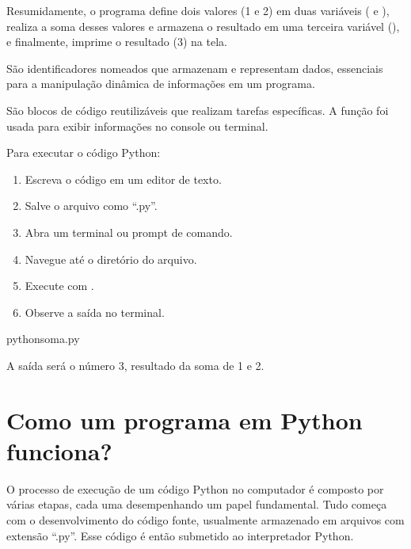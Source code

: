 \documentclass[letterpaper,10pt,english]{jupyterBook}
\begin{document}
\sphinxAtStartPar
Resumidamente, o programa define dois valores (1 e 2) em duas variáveis ( e ), realiza a soma desses valores e armazena o resultado em uma terceira variável (), e finalmente, imprime o resultado (3) na tela.

\sphinxAtStartPar
{}

\sphinxAtStartPar
São identificadores nomeados que armazenam e representam dados, essenciais para a manipulação dinâmica de informações em um programa.

\sphinxAtStartPar
{}

\sphinxAtStartPar
São blocos de código reutilizáveis que realizam tarefas específicas. A função  foi usada para exibir informações no console ou terminal.

\sphinxAtStartPar
Para executar o código Python:
\begin{enumerate}
%
\item {} 
\sphinxAtStartPar
Escreva o código em um editor de texto.

\item {} 
\sphinxAtStartPar
Salve o arquivo como “.py”.

\item {} 
\sphinxAtStartPar
Abra um terminal ou prompt de comando.

\item {} 
\sphinxAtStartPar
Navegue até o diretório do arquivo.

\item {} 
\sphinxAtStartPar
Execute com .

\item {} 
\sphinxAtStartPar
Observe a saída no terminal.

\end{enumerate}

\begin{sphinxVerbatim}[commandchars=\\\{\}]
pythonsoma.py
\end{sphinxVerbatim}

\sphinxAtStartPar
A saída será o número 3, resultado da soma de 1 e 2.


\section{Como um programa em Python funciona?}
\label{\detokenize{chapters/ch1/ch1:como-um-programa-em-python-funciona}}
\sphinxAtStartPar
O processo de execução de um código Python no computador é composto por várias etapas, cada uma desempenhando um papel fundamental. Tudo começa com o desenvolvimento do código fonte, usualmente armazenado em arquivos com extensão “.py”. Esse código é então submetido ao interpretador Python.
\end{document}

